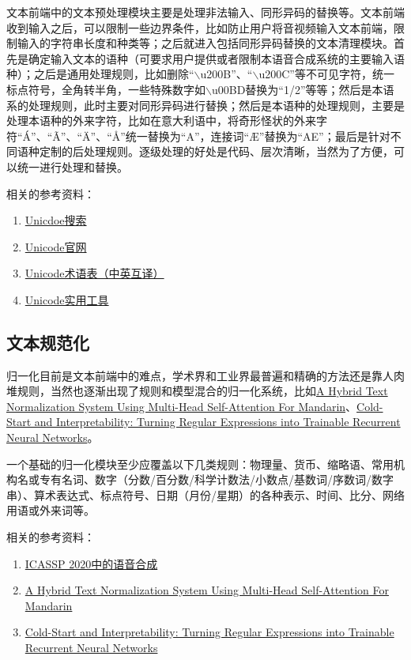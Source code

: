\documentclass[cn,10pt,math=newtx,citestyle=gb7714-2015,bibstyle=gb7714-2015]{elegantbook}
\begin{document}
文本前端中的文本预处理模块主要是处理非法输入、同形异码的替换等。文本前端收到输入之后，可以限制一些边界条件，比如防止用户将音视频输入文本前端，限制输入的字符串长度和种类等；之后就进入包括同形异码替换的文本清理模块。首先是确定输入文本的语种（可要求用户提供或者限制本语音合成系统的主要输入语种）；之后是通用处理规则，比如删除“$\backslash$u200B”、“$\backslash$u200C”等不可见字符，统一标点符号，全角转半角，一些特殊数字如$\backslash$u00BD替换为“1/2”等等；然后是本语系的处理规则，此时主要对同形异码进行替换；然后是本语种的处理规则，主要是处理本语种的外来字符，比如在意大利语中，将奇形怪状的外来字符“Á”、“Ã”、“Ä”、“Å”统一替换为“A”，连接词“Æ”替换为“AE”；最后是针对不同语种定制的后处理规则。逐级处理的好处是代码、层次清晰，当然为了方便，可以统一进行处理和替换。

相关的参考资料：

\begin{enumerate}
  \item \href{https://unicode-table.com/cn}{Unicdoe搜索}
  \item \href{https://unicode.org/main.html}{Unicode官网}
  \item \href{https://www.unicode.org/terminology/term_zh_Hans_CN_en.html}{Unicode术语表（中英互译）}
  \item \href{https://www.unicode.org/unibook}{Unicode实用工具}
\end{enumerate}

\subsection{文本规范化}

归一化目前是文本前端中的难点，学术界和工业界最普遍和精确的方法还是靠人肉堆规则，当然也逐渐出现了规则和模型混合的归一化系统，比如\href{https://arxiv.org/abs/1911.04128}{A Hybrid Text Normalization System Using Multi-Head Self-Attention For Mandarin}、\href{https://aclanthology.org/2020.emnlp-main.258/}{Cold-Start and Interpretability: Turning Regular Expressions into Trainable Recurrent Neural Networks}。

一个基础的归一化模块至少应覆盖以下几类规则：物理量、货币、缩略语、常用机构名或专有名词、数字（分数/百分数/科学计数法/小数点/基数词/序数词/数字串）、算术表达式、标点符号、日期（月份/星期）的各种表示、时间、比分、网络用语或外来词等。

相关的参考资料：

\begin{enumerate}
  \item \href{https://www.cnblogs.com/mengnan/p/13200062.html}{ICASSP 2020中的语音合成}
  \item \href{https://arxiv.org/abs/1911.04128}{A Hybrid Text Normalization System Using Multi-Head Self-Attention For Mandarin}
  \item \href{https://aclanthology.org/2020.emnlp-main.258/}{Cold-Start and Interpretability: Turning Regular Expressions into Trainable Recurrent Neural Networks}
\end{enumerate}
\end{document}
